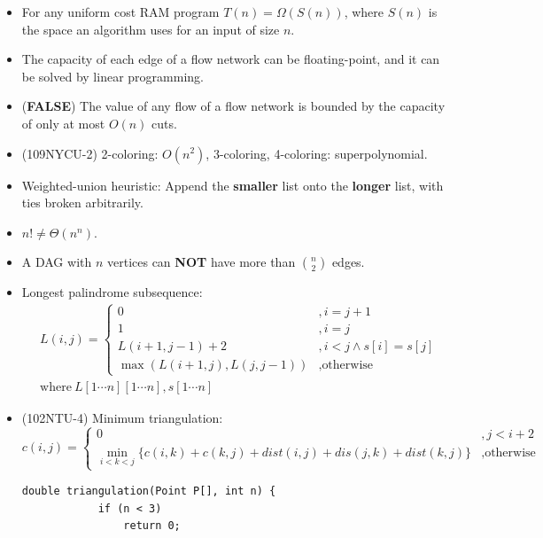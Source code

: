 \begin{itemize}
    \item For any uniform cost RAM program $T(n) = \Omega(S(n))$, where $S(n)$ is the space an algorithm uses for an input of size $n$.
    \item The capacity of each edge of a flow network can be floating-point, and it can be solved by linear programming.
    \item (\textbf{FALSE}) The value of any flow of a flow network is bounded by the capacity of only at most $O(n)$ cuts.
    \item (109NYCU-2) 2-coloring: $O(n^2)$, 3-coloring, 4-coloring: superpolynomial.
    \item Weighted-union heuristic: Append the \textbf{smaller} list onto the \textbf{longer} list, with ties broken arbitrarily.
    \item $n! \neq \Theta(n^n)$.
    \item A DAG with $n$ vertices can \textbf{NOT} have more than $\binom{n}{2}$ edges.
    \item Longest palindrome subsequence: \begin{equation}
        \begin{aligned}
            & L(i, j) = \begin{cases}
                0 &, i = j + 1 \\
                1 &, i = j \\
                L(i + 1, j - 1) + 2 &, i < j \land s[i] = s[j] \\
                \max(L(i + 1, j), L(j, j - 1)) &, \text{otherwise}
            \end{cases} \\
            & \text{where} \ L[1 \cdots n][1 \cdots n], s[1 \cdots n]
        \end{aligned}
    \end{equation}
    \item (102NTU-4) Minimum triangulation: \begin{equation}
        c(i, j) = \begin{cases}
            0 &, j < i + 2 \\
            \min\limits_{i < k < j}\{c(i, k) + c(k, j) + dist(i, j) + dis(j, k) + dist(k, j)\} &, \text{otherwise}
        \end{cases}
    \end{equation} \begin{lstlisting}[caption={Minimum triangulation.}, captionpos=b]
        double triangulation(Point P[], int n) {
            if (n < 3)
                return 0;
            

\end{lstlisting}
\end{itemize}

